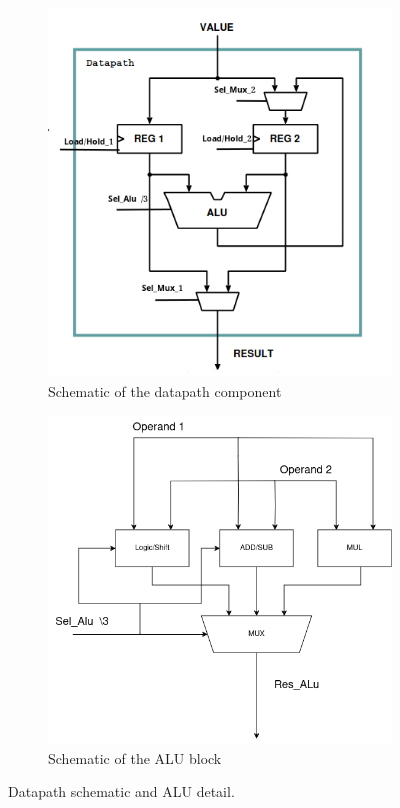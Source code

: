 \documentclass[12pt]{article}
\begin{document}
\begin{figure}[H]
	\centering
	\begin{subfigure}{0.45\textwidth} 
		\centering
		\includegraphics[width = \linewidth]{Imagens/datapath.png}
		\caption{Schematic of the datapath component}
		\label{fig:datapath}
	\end{subfigure}
	\begin{subfigure} {0.45\textwidth}
		\centering
		\includegraphics[width = \linewidth]{Imagens/ALU.png}
		\caption{Schematic of the ALU block}
		\label{fig:ALU}
	\end{subfigure}
	\caption{Datapath schematic and ALU detail.}
	\label{fig:both}
\end{figure}
\end{document}
